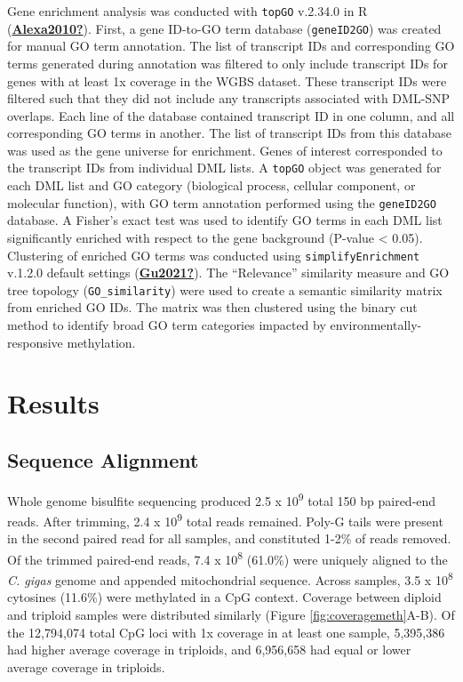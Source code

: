 \documentclass [11pt, proquest] {uwthesis}[2015/03/03]
\begin{document}
Gene enrichment analysis was conducted with \texttt{topGO} v.2.34.0 in R (\protect\hyperlink{ref-Alexa2010}{\textbf{Alexa2010?}}). First, a gene ID-to-GO term database (\texttt{geneID2GO}) was created for manual GO term annotation. The list of transcript IDs and corresponding GO terms generated during annotation was filtered to only include transcript IDs for genes with at least 1x coverage in the WGBS dataset. These transcript IDs were filtered such that they did not include any transcripts associated with DML-SNP overlaps. Each line of the database contained transcript ID in one column, and all corresponding GO terms in another. The list of transcript IDs from this database was used as the gene universe for enrichment. Genes of interest corresponded to the transcript IDs from individual DML lists. A \texttt{topGO} object was generated for each DML list and GO category (biological process, cellular component, or molecular function), with GO term annotation performed using the \texttt{geneID2GO} database. A Fisher's exact test was used to identify GO terms in each DML list significantly enriched with respect to the gene background (P-value \textless{} 0.05). Clustering of enriched GO terms was conducted using \texttt{simplifyEnrichment} v.1.2.0 default settings (\protect\hyperlink{ref-Gu2021}{\textbf{Gu2021?}}). The ``Relevance'' similarity measure and GO tree topology (\texttt{GO\_similarity}) were used to create a semantic similarity matrix from enriched GO IDs. The matrix was then clustered using the binary cut method to identify broad GO term categories impacted by environmentally-responsive methylation.

\hypertarget{results-3}{%
\section{Results}\label{results-3}}

\hypertarget{sequence-alignment-3}{%
\subsection{Sequence Alignment}\label{sequence-alignment-3}}

Whole genome bisulfite sequencing produced 2.5 x 10\textsuperscript{9} total 150 bp paired-end reads. After trimming, 2.4 x 10\textsuperscript{9} total reads remained. Poly-G tails were present in the second paired read for all samples, and constituted 1-2\% of reads removed. Of the trimmed paired-end reads, 7.4 x 10\textsuperscript{8} (61.0\%) were uniquely aligned to the \emph{C. gigas} genome and appended mitochondrial sequence. Across samples, 3.5 x 10\textsuperscript{8} cytosines (11.6\%) were methylated in a CpG context. Coverage between diploid and triploid samples were distributed similarly (Figure \ref{fig:coveragemeth}A-B). Of the 12,794,074 total CpG loci with 1x coverage in at least one sample, 5,395,386 had higher average coverage in triploids, and 6,956,658 had equal or lower average coverage in triploids.
\end{document}
